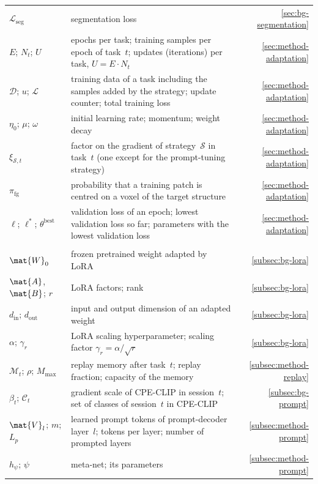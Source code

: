 {\begin{longtable}{@{}>{\raggedright\arraybackslash}p{3.4cm}>{\raggedright\arraybackslash}p{10.2cm}r@{}}
$\mathcal{L}_{\mathrm{seg}}$ & segmentation loss & \ref{sec:bg-segmentation} \\
$E$; $N_t$; $U$ & epochs per task; training samples per epoch of task~$t$; updates (iterations) per task, $U = E \cdot N_t$ & \ref{sec:method-adaptation} \\
$\mathcal{D}$; $u$; $\mathcal{L}$ & training data of a task including the samples added by the strategy; update counter; total training loss & \ref{sec:method-adaptation} \\
$\eta_0$; $\mu$; $\omega$ & initial learning rate; momentum; weight decay & \ref{sec:method-adaptation} \\
$\xi_{\mathcal{S},t}$ & factor on the gradient of strategy~$\mathcal{S}$ in task~$t$ (one except for the prompt-tuning strategy) & \ref{sec:method-adaptation} \\
$\pi_{\mathrm{fg}}$ & probability that a training patch is centred on a voxel of the target structure & \ref{sec:method-adaptation} \\
$\ell$; $\ell^{*}$; $\theta^{\mathrm{best}}$ & validation loss of an epoch; lowest validation loss so far; parameters with the lowest validation loss & \ref{sec:method-adaptation} \\
\addlinespace
\multicolumn{3}{@{}l}{\textit{Strategies}} \\*
$\mat{W}_0$ & frozen pretrained weight adapted by LoRA & \ref{subsec:bg-lora} \\*
$\mat{A}$, $\mat{B}$; $r$ & LoRA factors; rank & \ref{subsec:bg-lora} \\
$d_{\mathrm{in}}$; $d_{\mathrm{out}}$ & input and output dimension of an adapted weight & \ref{subsec:bg-lora} \\
$\alpha$; $\gamma_r$ & LoRA scaling hyperparameter; scaling factor $\gamma_r = \alpha / \sqrt{r}$ & \ref{subsec:bg-lora} \\
$\mathcal{M}_t$; $\rho$; $M_{\max}$ & replay memory after task~$t$; replay fraction; capacity of the memory & \ref{subsec:method-replay} \\
$\beta_t$; $\mathcal{C}_t$ & gradient scale of CPE-CLIP in session~$t$; set of classes of session~$t$ in CPE-CLIP & \ref{subsec:bg-prompt} \\
$\mat{V}_l$; $m$; $L_p$ & learned prompt tokens of prompt-decoder layer~$l$; tokens per layer; number of prompted layers & \ref{subsec:method-prompt} \\
$h_\psi$; $\psi$ & meta-net; its parameters & \ref{subsec:method-prompt} \\

\end{longtable}}
